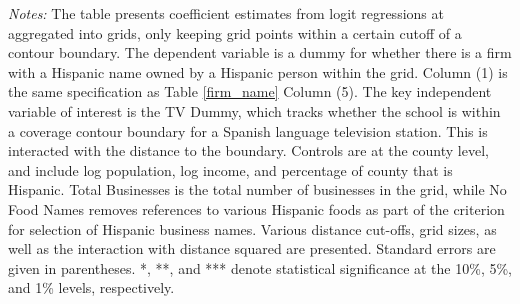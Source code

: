 \begin{table}[!h]
{\begin{threeparttable}
			\begin{tablenotes}[flushleft]
				\item \textit{Notes:} The table presents coefficient estimates from logit regressions at aggregated into grids, only keeping grid points within a certain cutoff of a contour boundary. The dependent variable is a dummy for whether there is a firm with a Hispanic name owned by a Hispanic person within the grid. Column (1) is the same specification as Table \ref{firm_name} Column (5). The key independent variable of interest is the TV Dummy, which tracks whether the school is within a coverage contour boundary for a Spanish language television station. This is interacted with the distance to the boundary. Controls are at the county level, and include log population, log income, and percentage of county that is Hispanic. Total Businesses is the total number of businesses in the grid, while No Food Names removes references to various Hispanic foods as part of the criterion for selection of Hispanic business names. Various distance cut-offs, grid sizes, as well as the interaction with distance squared are presented. Standard errors are given in parentheses. *, **, and *** denote statistical significance at the 10\%, 5\%, and 1\% levels, respectively.
			\end{tablenotes}
		\end{threeparttable}
	}
\end{table}